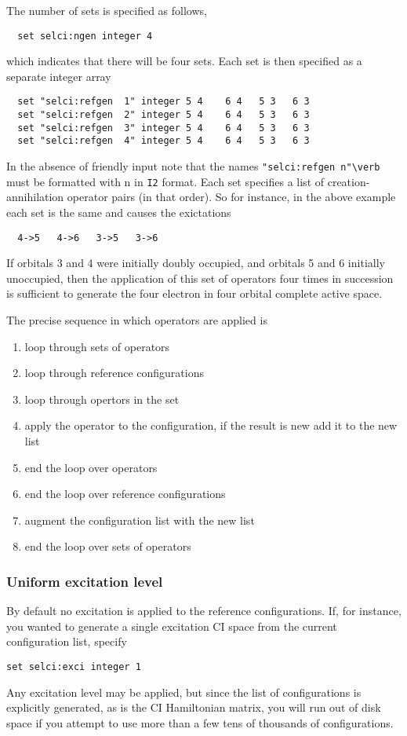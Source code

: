 The number of sets is specified as follows,
\begin{verbatim}
  set selci:ngen integer 4
\end{verbatim}
which indicates that there will be four sets.  Each set is then
specified as a separate integer array
\begin{verbatim}
  set "selci:refgen  1" integer 5 4    6 4   5 3   6 3  
  set "selci:refgen  2" integer 5 4    6 4   5 3   6 3  
  set "selci:refgen  3" integer 5 4    6 4   5 3   6 3  
  set "selci:refgen  4" integer 5 4    6 4   5 3   6 3  
\end{verbatim}
In the absence of friendly input note that the names
\verb+"selci:refgen n"\verb+ must be formatted with n in \verb+I2+
format. Each set specifies a list of creation-annihilation operator
pairs (in that order).  So for instance, in the above example each set
is the same and causes the exictations
\begin{verbatim}
  4->5   4->6   3->5   3->6
\end{verbatim}
If orbitals 3 and 4 were initially doubly occupied, and orbitals 5 and
6 initially unoccupied, then the application of this set of operators
four times in succession is sufficient to generate the four electron
in four orbital complete active space.

The precise sequence in which operators are applied is
\begin{enumerate}
\item loop through sets of operators
\item loop through reference configurations
\item loop through opertors in the set
\item apply the operator to the configuration, if the result is new add it
  to the new list
\item end the loop over operators
\item end the loop over reference configurations
\item augment the configuration list with the new list
\item end the loop over sets of operators
\end{enumerate}

\subsubsection{Uniform excitation level}

By default no excitation is applied to the reference configurations.
If, for instance, you wanted to generate a single excitation CI space
from the current configuration list, specify
\begin{verbatim}
set selci:exci integer 1
\end{verbatim}
Any excitation level may be applied, but since the list of
configurations is explicitly generated, as is the CI Hamiltonian
matrix, you will run out of disk space if you attempt to use more than
a few tens of thousands of configurations.

